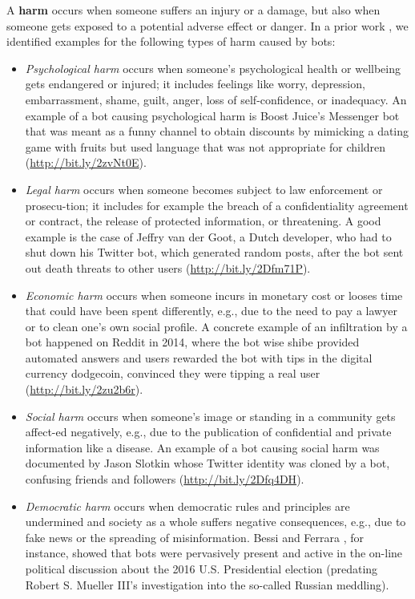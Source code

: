 A \textbf{harm} occurs when someone suffers an injury or a damage, but also when someone gets exposed to a potential adverse effect or danger. In a prior work \cite{DanielIC2019}, we identified examples for the following types of harm caused by bots:

\begin{itemize}
	\item[\PencilRight] \emph{Psychological harm} occurs when someone's psychological health or wellbeing gets endangered or injured; it includes feelings like worry, depression, embarrassment, shame, guilt, anger, loss of self-confidence, or inadequacy. An example of a bot causing psychological harm is Boost Juice's Messenger bot that was meant as a funny channel to obtain discounts by mimicking a dating game with fruits but used language that was not appropriate for children (\url{http://bit.ly/2zvNt0E}).
	
	\item[\PencilRight] \emph{Legal harm} occurs when someone becomes subject to law enforcement or prosecu-tion; it includes for example the breach of a confidentiality agreement or contract, the release of protected information, or threatening. A good example is the case of Jeffry van der Goot, a Dutch developer, who had to shut down his Twitter bot, which generated random posts, after the bot sent out death threats to other users (\url{http://bit.ly/2Dfm71P}). 
	
	\item[\PencilRight] \emph{Economic harm} occurs when someone incurs in monetary cost or looses time that could have been spent differently, e.g., due to the need to pay a lawyer or to clean one's own social profile. A concrete example of an infiltration by a bot happened on Reddit in 2014, where the bot wise shibe provided automated answers and users rewarded the bot with tips in the digital currency dodgecoin, convinced they were tipping a real user (\url{http://bit.ly/2zu2b6r}).
	
	\item[\PencilRight] \emph{Social harm} occurs when someone's image or standing in a community gets affect-ed negatively, e.g., due to the publication of confidential and private information like a disease. An example of a bot causing social harm was documented by Jason Slotkin whose Twitter identity was cloned by a bot, confusing friends and followers (\url{http://bit.ly/2Dfq4DH}). 
	
	\item[\PencilRight] \emph{Democratic harm} occurs when democratic rules and principles are undermined and society as a whole suffers negative consequences, e.g., due to fake news or the spreading of misinformation. Bessi and Ferrara \cite{bessi}, for instance, showed that bots were pervasively present and active in the on-line political discussion about the 2016 U.S. Presidential election (predating Robert S. Mueller III's investigation into the so-called Russian meddling).
\end{itemize}

